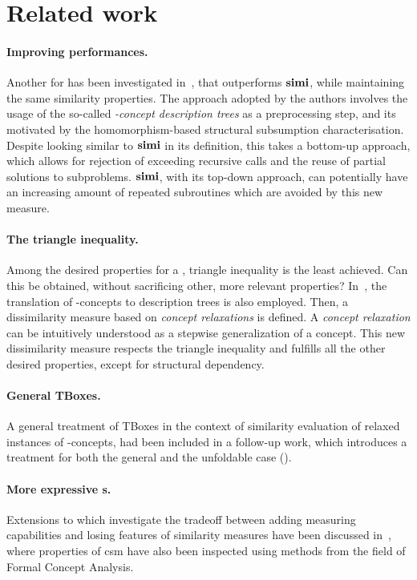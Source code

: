 \section{Related work}

\paragraph{Improving performances.}
Another \csm for \elh has been investigated in~\cite{simEL}, that outperforms \(\mathbf{simi}\), while maintaining the same similarity properties.
The approach adopted by the authors involves the usage of the so-called \emph{\elh-concept description trees} as a preprocessing step, and its motivated by the homomorphism-based structural subsumption characterisation.
Despite looking similar to \(\mathbf{simi}\) in its definition, this \csm takes a bottom-up approach, which allows for rejection of exceeding recursive calls and the reuse of partial solutions to subproblems.
\(\mathbf{simi}\), with its top-down approach, can potentially have an increasing amount of repeated subroutines which are avoided by this new measure.

\paragraph{The triangle inequality.}
Among the desired properties for a \csm, triangle inequality is the least achieved.
Can this be obtained, without sacrificing other, more relevant properties?
In~\cite{TriEq}, the translation of \el-concepts to description trees is also employed. Then, a dissimilarity measure based on \emph{concept relaxations} is defined. A \emph{concept relaxation} can be intuitively understood as a stepwise generalization of a concept.
This new dissimilarity measure respects the triangle inequality and fulfills all the other desired properties, except for structural dependency.

  \paragraph{General TBoxes.} A general treatment of TBoxes in the context of similarity evaluation of relaxed instances of \el-concepts, had been included in a follow-up work, which introduces a treatment for both the general and the unfoldable case (\cite{Ec14}).

  \paragraph{More expressive \dl{}s.}
  Extensions to \simi which investigate the tradeoff between adding measuring capabilities and losing  features of similarity measures have been discussed in~\cite{Lae-dip}, where properties of \gls{csm} have also been inspected using methods from the field of Formal Concept Analysis.

